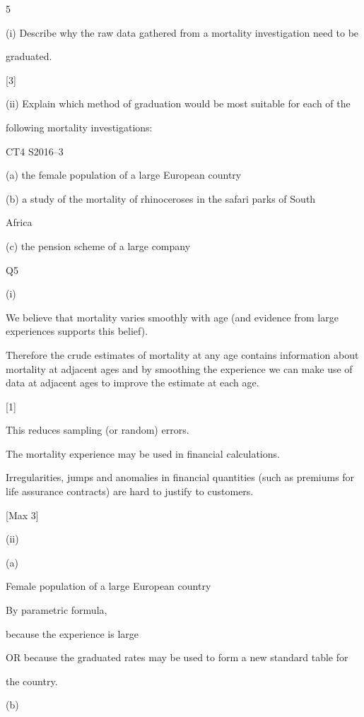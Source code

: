 \documentclass[a4paper,12pt]{article}
\begin{document}
5

(i) Describe why the raw data gathered from a mortality investigation need to be

graduated.

[3]

(ii) Explain which method of graduation would be most suitable for each of the

following mortality investigations:

CT4 S2016–3

(a) the female population of a large European country

(b) a study of the mortality of rhinoceroses in the safari parks of South

Africa

(c) the pension scheme of a large company

\newpage


Q5

(i)

We believe that mortality varies smoothly with age (and evidence from large experiences supports this belief).



Therefore the crude estimates of mortality at any age contains information about mortality at adjacent ages and by smoothing the experience we can make use of data at adjacent ages to improve the
estimate at each age.

[1]

This reduces sampling (or random) errors. 

The mortality experience may be used in financial calculations. 

Irregularities, jumps and anomalies in financial quantities (such as premiums for life assurance contracts) are hard to justify to customers.



[Max 3]

(ii)

(a)

Female population of a large European country

By parametric formula,



because the experience is large

OR because the graduated rates may be used to form a new standard table for

the country.



(b)
\end{document}
